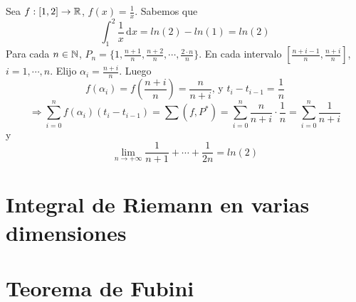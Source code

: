 \begin{eg}
  Sea $f: [1, 2] \to \mathbb{R}$, $f(x) = \frac{1}{x}$. Sabemos que \begin{equation}\int_1^2 \frac{1}{x} \, \mathrm{d}x = ln(2) - ln(1) = ln(2)\end{equation} Para cada $n \in \mathbb{N}$, $P_n = \{1, \frac{n+1}{n}, \frac{n+2}{n}, \cdots, \frac{2 \cdot n}{n}\}$. En cada intervalo $[\frac{n+i-1}{n}, \frac{n+i}{n}]$, $i = 1, \cdots, n$. Elijo $\alpha_i = \frac{n+i}{n}$. Luego 
  \begin{equation}
    f(\alpha_i) = f(\frac{n+i}{n}) = \frac{n}{n+i} \text{, y } t_i - t_{i-1} = \frac{1}{n}
  \end{equation}
  \begin{equation}
    \Rightarrow \sum_{i = 0}^n f(\alpha_i) (t_i - t_{i-1}) = \sum(f, P^*) = \sum_{i = 0}^n \frac{n}{n+i} \cdot \frac{1}{n} = \sum_{i = 0}^n \frac{1}{n+i}
  \end{equation} y
  \begin{equation}
    \lim_{n \to +\infty} \frac{1}{n+1} + \cdots + \frac{1}{2n} = ln(2)
  \end{equation}
\end{eg}

\section{Integral de Riemann en varias dimensiones}

\section{Teorema de Fubini}
